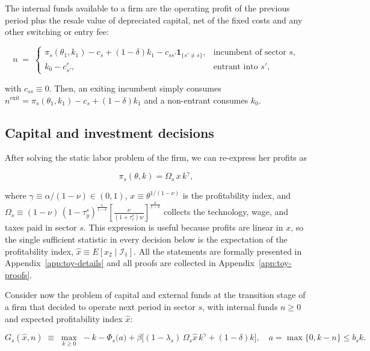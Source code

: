 \documentclass[12pt]{article}
\begin{document}
The internal funds available to a firm are the operating profit of the previous period plus the resale value of depreciated capital, net of the fixed costs and any other switching or entry fee:

\begin{equation}
  n \;=\;
  \begin{cases}
    \pi_{s}(\theta_{1},k_{1}) - c_{s} + (1-\delta)k_{1}
      - c_{ss'}\mathbf{1}_{\{s'\neq s\}},
      & \text{incumbent of sector } s,\\[2pt]
    k_{0} - c^e_{s'}, & \text{entrant into } s' ,
  \end{cases}
  \label{eq:toy-n}
\end{equation}

with $c_{ss}\equiv 0$. Then, an exiting incumbent simply consumes $n^{\text{exit}}=\pi_{s}(\theta_{1},k_{1})-c_{s}+(1-\delta)k_{1}$ and a non-entrant consumes $k_{0}$.

\subsection{Capital and investment decisions}
\label{sec:investment_problem}

After solving the static labor problem of the firm, we can re-express her profits as

\begin{equation}
    \pi_s(\theta, k) = \Omega_s\, x\, k^{\gamma},
\end{equation}

where $\gamma \equiv \alpha/(1-\nu) \in (0,1)$, $x \equiv \theta^{1/(1-\nu)}$ is the profitability index, and $\Omega_{s} \equiv (1-\nu)\,(1-\tau_y^{s})^{\frac{1}{1-\nu}} \left[\frac{\nu}{(1+\tau_{\ell}^{s})w}\right]^{\frac{\nu}{1-\nu}}$ collects the technology, wage, and taxes paid in sector $s$. This expression is useful because profits are linear in $x$, so the single sufficient statistic in every decision below is the expectation of the profitability index, $\hat{x} \equiv E[x_2 \mid \mathcal{I}_1]$. All the statements are formally presented in Appendix~\ref{app:toy-details} and all proofs are collected in Appendix~\ref{app:toy-proofs}.

Consider now the problem of capital and external funds at the transition stage of a firm that decided to operate next period in sector $s$, with internal funds $n \geq 0$ and expected profitability index $\hat x$:

\begin{equation}
  G_{s}(\hat x,n) \;\equiv\; \max_{k\geq0}\;
  -k - \Phi_{s}\!\big(a\big) + \beta\Big[(1-\lambda_{s})\,\Omega_{s}\hat x\,
      k^{\gamma} + (1-\delta)k\Big], \quad a=\max\{0,k-n\} \leq b_{s}k .
  \label{eq:toy-Gdef}
\end{equation}
\end{document}

